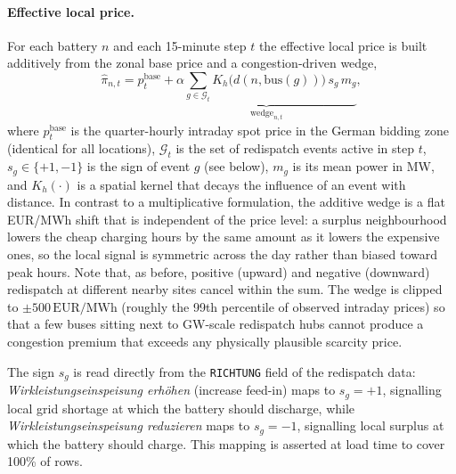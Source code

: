 \paragraph{Effective local price.}
For each battery $n$ and each 15-minute step $t$ the effective local price is built additively from the zonal base price and a congestion-driven wedge,
\begin{equation}
\label{eq:effective_price_main}
\hat{\pi}_{n,t} = p^{\text{base}}_t + \underbrace{\alpha \sum_{g \in \mathcal{G}_t} K_h\!\big(d(n, \text{bus}(g))\big)\, s_g\, m_g}_{\text{wedge}_{n,t}},
\end{equation}
where $p^{\text{base}}_t$ is the quarter-hourly intraday spot price in the German bidding zone (identical for all locations), $\mathcal{G}_t$ is the set of redispatch events active in step $t$, $s_g \in \{+1, -1\}$ is the sign of event $g$ (see below), $m_g$ is its mean power in MW, and $K_h(\cdot)$ is a spatial kernel that decays the influence of an event with distance. In contrast to a multiplicative formulation, the additive wedge is a flat EUR/MWh shift that is independent of the price level: a surplus neighbourhood lowers the cheap charging hours by the same amount as it lowers the expensive ones, so the local signal is symmetric across the day rather than biased toward peak hours. Note that, as before, positive (upward) and negative (downward) redispatch at different nearby sites cancel within the sum. The wedge is clipped to $\pm 500\,\text{EUR/MWh}$ (roughly the 99th percentile of observed intraday prices) so that a few buses sitting next to GW-scale redispatch hubs cannot produce a congestion premium that exceeds any physically plausible scarcity price.

The sign $s_g$ is read directly from the \texttt{RICHTUNG} field of the redispatch data: \emph{Wirkleistungseinspeisung erh\"ohen} (increase feed-in) maps to $s_g = +1$, signalling local grid shortage at which the battery should discharge, while \emph{Wirkleistungseinspeisung reduzieren} maps to $s_g = -1$, signalling local surplus at which the battery should charge. This mapping is asserted at load time to cover 100\% of rows.

